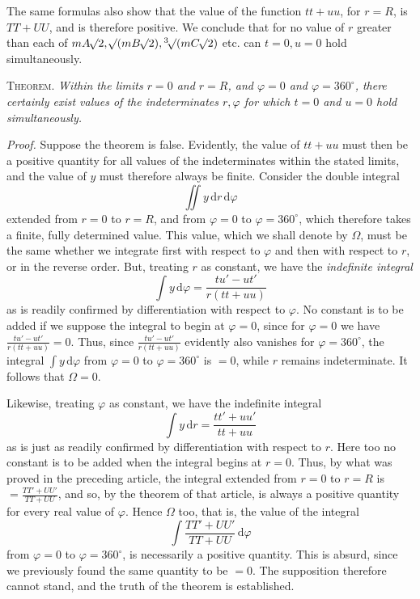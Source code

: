 The same formulas also show that the value of the function $tt+uu$, for $r=R$, is $TT+UU$, and is therefore positive. We conclude that for no value of $r$ greater than each of $mA\BareRoot{2},\BareRoot{(mB\BareRoot{2})},\BareRoot[3]{(mC\BareRoot{2})}$ etc. can $t=0,u=0$ hold simultaneously.

\textsc{Theorem.} \textit{Within the limits $r=0$ and $r=R$, and $\varphi=0$ and $\varphi=360^\circ$, there certainly exist values of the indeterminates $r,\varphi$ for which $t=0$ and $u=0$ hold simultaneously.}

\textit{Proof.} Suppose the theorem is false. Evidently, the value of $tt+uu$ must then be a positive quantity for all values of the indeterminates within the stated limits, and the value of $y$ must therefore always be finite. Consider the double integral
\[
\iint y\,\mathrm dr\,\mathrm d\varphi
\]
extended from $r=0$ to $r=R$, and from $\varphi=0$ to $\varphi=360^\circ$, which therefore takes a finite, fully determined value. This value, which
we shall denote by $\Omega$, must be the same whether we integrate first with respect to $\varphi$ and then with respect to $r$, or in the reverse order. But, treating $r$ as constant, we have the \textit{indefinite integral}
\[
\int y\,\mathrm d\varphi=\frac{tu'-ut'}{r(tt+uu)}
\]
as is readily confirmed by differentiation with respect to $\varphi$. No constant is to be added if we suppose the integral to begin at $\varphi=0$, since for $\varphi=0$ we have $\frac{tu'-ut'}{r(tt+uu)}=0$. Thus, since $\frac{tu'-ut'}{r(tt+uu)}$ evidently also vanishes for $\varphi=360^\circ$, the integral $\int y\,\mathrm d\varphi$ from $\varphi=0$ to $\varphi=360^\circ$ is $=0$, while $r$ remains indeterminate. It follows that $\Omega=0$.

Likewise, treating $\varphi$ as constant, we have the indefinite integral
\[
\int y\,\mathrm dr=\frac{tt'+uu'}{tt+uu}
\]
as is just as readily confirmed by differentiation with respect to $r$. Here too no constant is to be added when the integral begins at $r=0$. Thus, by what was proved in the preceding article, the integral extended from $r=0$ to $r=R$ is $=\frac{TT'+UU'}{TT+UU}$, and so, by the theorem of that article, is always a positive quantity for every real value of $\varphi$. Hence $\Omega$ too, that is, the value of the integral
\[
\int\frac{TT'+UU'}{TT+UU}\,\mathrm d\varphi
\]
from $\varphi=0$ to $\varphi=360^\circ$, is necessarily a positive quantity. This is absurd, since we previously found the same quantity to be $=0$. The supposition therefore cannot stand, and the truth of the theorem is established.

